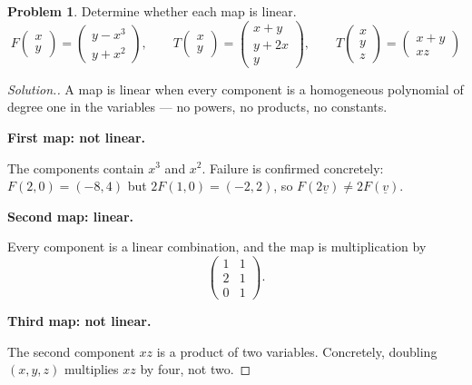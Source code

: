 \documentclass[11pt,a4paper]{article}
\theoremstyle{definition}
\newtheorem{problemx}{Problem}[subsection]
\newenvironment{problem}{\begin{problemx}}{\end{problemx}}
\newenvironment{solution}
  {\renewcommand{\qedsymbol}{}\begin{proof}[\textit{Solution}.]}
  {\end{proof}}
\newcommand{\subhead}[1]{%
  \par\medskip\noindent\textbf{#1}\par\nobreak\smallskip}
\begin{document}
\begin{problem}
Determine whether each map is linear.
$$F\begin{pmatrix}x\\y\end{pmatrix} = \begin{pmatrix}y-x^3\\ y+x^2\end{pmatrix},
\qquad
T\begin{pmatrix}x\\y\end{pmatrix} = \begin{pmatrix}x+y\\ y+2x\\ y\end{pmatrix},
\qquad
T\begin{pmatrix}x\\y\\z\end{pmatrix} = \begin{pmatrix}x+y\\ xz\end{pmatrix}$$
\end{problem}
\begin{solution}
A map is linear when every component is a homogeneous polynomial of degree one
in the variables --- no powers, no products, no constants.

\subhead{First map: not linear.} The components contain $x^3$ and $x^2$. Failure
is confirmed concretely: $F(2,0) = (-8,4)$ but $2F(1,0) = (-2,2)$, so
$F(2\underline{v})\neq 2F(\underline{v})$.

\subhead{Second map: linear.} Every component is a linear combination, and the
map is multiplication by
$$\begin{pmatrix}1 & 1\\ 2 & 1\\ 0 & 1\end{pmatrix}.$$

\subhead{Third map: not linear.} The second component $xz$ is a product of two
variables. Concretely, doubling $(x,y,z)$ multiplies $xz$ by four, not two.
\end{solution}
\end{document}
